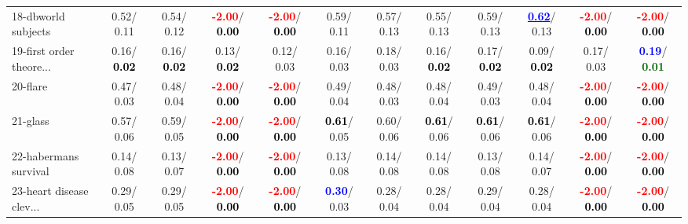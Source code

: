 \begin{table}[h]
\begin{center}
{\begin{tabular}{lc|c|c|c|c|c|c|c|c|c|c}
18-dbworld subjects &   0.52/  0.11 &   0.54/  0.12 & \textcolor{red}{\textbf{ -2.00}}/\textcolor{black}{\textbf{  0.00}} & \textcolor{red}{\textbf{ -2.00}}/\textcolor{black}{\textbf{  0.00}} &   0.59/  0.11 &   0.57/  0.13 &   0.55/  0.13 &   0.59/  0.13 & \underline{\textcolor{blue}{\textbf{  0.62}}}/  0.13 & \textcolor{red}{\textbf{ -2.00}}/\textcolor{black}{\textbf{  0.00}} & \textcolor{red}{\textbf{ -2.00}}/\textcolor{black}{\textbf{  0.00}} \\
19-first order theore... &   0.16/\textcolor{black}{\textbf{  0.02}} &   0.16/\textcolor{black}{\textbf{  0.02}} &   0.13/\textcolor{black}{\textbf{  0.02}} &   0.12/  0.03 &   0.16/  0.03 &   0.18/  0.03 &   0.16/\textcolor{black}{\textbf{  0.02}} &   0.17/\textcolor{black}{\textbf{  0.02}} &   0.09/\textcolor{black}{\textbf{  0.02}} &   0.17/  0.03 & \textcolor{blue}{\textbf{  0.19}}/\textcolor{darkgreen}{\textbf{  0.01}} \\
20-flare &   0.47/  0.03 &   0.48/  0.04 & \textcolor{red}{\textbf{ -2.00}}/\textcolor{black}{\textbf{  0.00}} & \textcolor{red}{\textbf{ -2.00}}/\textcolor{black}{\textbf{  0.00}} &   0.49/  0.04 &   0.48/  0.03 &   0.48/  0.04 &   0.49/  0.03 &   0.48/  0.04 & \textcolor{red}{\textbf{ -2.00}}/\textcolor{black}{\textbf{  0.00}} & \textcolor{red}{\textbf{ -2.00}}/\textcolor{black}{\textbf{  0.00}} \\
21-glass &   0.57/  0.06 &   0.59/  0.05 & \textcolor{red}{\textbf{ -2.00}}/\textcolor{black}{\textbf{  0.00}} & \textcolor{red}{\textbf{ -2.00}}/\textcolor{black}{\textbf{  0.00}} & \textcolor{black}{\textbf{  0.61}}/  0.05 &   0.60/  0.06 & \textcolor{black}{\textbf{  0.61}}/  0.06 & \textcolor{black}{\textbf{  0.61}}/  0.06 & \textcolor{black}{\textbf{  0.61}}/  0.06 & \textcolor{red}{\textbf{ -2.00}}/\textcolor{black}{\textbf{  0.00}} & \textcolor{red}{\textbf{ -2.00}}/\textcolor{black}{\textbf{  0.00}} \\ \hline
22-habermans survival &   0.14/  0.08 &   0.13/  0.07 & \textcolor{red}{\textbf{ -2.00}}/\textcolor{black}{\textbf{  0.00}} & \textcolor{red}{\textbf{ -2.00}}/\textcolor{black}{\textbf{  0.00}} &   0.13/  0.08 &   0.14/  0.08 &   0.14/  0.08 &   0.13/  0.08 &   0.14/  0.07 & \textcolor{red}{\textbf{ -2.00}}/\textcolor{black}{\textbf{  0.00}} & \textcolor{red}{\textbf{ -2.00}}/\textcolor{black}{\textbf{  0.00}} \\
23-heart disease clev... &   0.29/  0.05 &   0.29/  0.05 & \textcolor{red}{\textbf{ -2.00}}/\textcolor{black}{\textbf{  0.00}} & \textcolor{red}{\textbf{ -2.00}}/\textcolor{black}{\textbf{  0.00}} & \textcolor{blue}{\textbf{  0.30}}/  0.03 &   0.28/  0.04 &   0.28/  0.04 &   0.29/  0.04 &   0.28/  0.04 & \textcolor{red}{\textbf{ -2.00}}/\textcolor{black}{\textbf{  0.00}} & \textcolor{red}{\textbf{ -2.00}}/\textcolor{black}{\textbf{  0.00}} \\

\end{tabular}}
\end{center}
\end{table}

